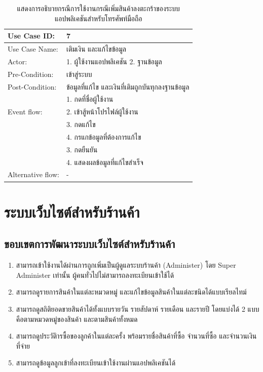 \begin{table}[htbp]
  \centering
  \caption{แสดงการอธิบายกรณีการใช้งานกรณีเพิ่มสินค้าลงตะกร้าของระบบแอปพลิเคชันสำหรับโทรศัพท์มือถือ}
  \begin{tabularx}{\textwidth}{|p{3cm}|X|}
    \hline
    \multirow{1}{3cm}{Use Case ID:}      & 7                                   \\
    \hline
    \multirow{1}{3cm}{Use Case Name:}    & เติมเงิน และแก้ไขข้อมูล                  \\
    \hline
    \multirow{1}{3cm}{Actor:}            & 1. ผู้ใช้งานแอปพลิเคชัน 2. ฐานข้อมูล       \\
    \hline
    \multirow{1}{3cm}{Pre-Condition:}    & เข้าสู่ระบบ                            \\
    \hline
    \multirow{1}{3cm}{Post-Condition:}   & ข้อมูลที่แก้ไข และเงินที่เติมถูกบันทุกลงฐานข้อมูล \\
    \hline
    \multirow{3}{3cm}{Event flow:}       & 1. กดที่ชื่อผู้ใช้งาน                      \\
                                         & 2. เข้าสู้หน้าโปรไฟล์ผู้ใช้งาน              \\ & 3. กดแก้ไข \\
                                         & 4. กรแกข้อมูลที่ต้องการแก้ไข              \\ & 3. กดยืนยัน \\
                                         & 4. แสดงผลข้อมูลที่แก้ไขสำเร็จ              \\
    \hline
    \multirow{1}{3cm}{Alternative flow:} & -                                   \\
    \hline
  \end{tabularx}
\end{table}

\section{ระบบเว็บไซต์สำหรับร้านค้า}
\subsection{ขอบเขตการพัฒนาระบบเว็บไซต์สำหรับร้านค้า}
\begin{enumerate}
  \item สามารถเข้าใช้งานได้ผ่านการถูกเพิ่มเป็นผู้ดูแลระบบร้านค้า (Administer) โดย Super Administer เท่านั้น ผู้คนทั่วไปไม่สามารถลงทะเบียนเข้าใช้ได้
  \item สามารถดูรายการสินค้าในแต่ละหมวดหมู่ และแก้ไขข้อมูลสินค้าในแต่ละชนิดได้แบบเรียลไทม์
  \item สามารถดูสถิติยอดขายสินค้าได้ทั้งแบบรายวัน รายสัปดาห์ รายเดือน และรายปี โดยแบ่งได้ 2 แบบ คือตามหมวดหมู่ของสินค้า และตามสินค้าทั้งหมด
  \item สามารถดูประวัติารซื้อของลูกค้าในแต่ละครั้ง พร้อมรายชื่อสินค้าที่ซื้อ จำนวนที่ซื้อ และจำนวนเงินที่จ่าย
  \item สามารถดูข้อมูลลูกเข้าที่ลงทะเบียนเข้าใช้งานผ่านแอปพลิเคชันได้

\end{enumerate}

